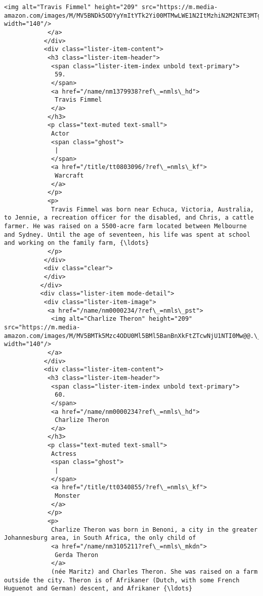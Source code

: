 \documentclass[11pt]{article}
\begin{document}
\begin{Verbatim}[commandchars=\\\{\}]
             <img alt="Travis Fimmel" height="209" src="https://m.media-amazon.com/images/M/MV5BNDk5ODYyYmItYTk2Yi00MTMwLWE1N2ItMzhiN2M2NTE3MTg1XkEyXkFqcGdeQXVyODc2OTcwNDE@.\_V1\_UY209\_CR79,0,140,209\_AL\_.jpg" width="140"/>
            </a>
           </div>
           <div class="lister-item-content">
            <h3 class="lister-item-header">
             <span class="lister-item-index unbold text-primary">
              59.
             </span>
             <a href="/name/nm1379938?ref\_=nmls\_hd">
              Travis Fimmel
             </a>
            </h3>
            <p class="text-muted text-small">
             Actor
             <span class="ghost">
              |
             </span>
             <a href="/title/tt0803096/?ref\_=nmls\_kf">
              Warcraft
             </a>
            </p>
            <p>
             Travis Fimmel was born near Echuca, Victoria, Australia, to Jennie, a recreation officer for the disabled, and Chris, a cattle farmer. He was raised on a 5500-acre farm located between Melbourne and Sydney. Until the age of seventeen, his life was spent at school and working on the family farm, {\ldots}
            </p>
           </div>
           <div class="clear">
           </div>
          </div>
          <div class="lister-item mode-detail">
           <div class="lister-item-image">
            <a href="/name/nm0000234/?ref\_=nmls\_pst">
             <img alt="Charlize Theron" height="209" src="https://m.media-amazon.com/images/M/MV5BMTk5Mzc4ODU0Ml5BMl5BanBnXkFtZTcwNjU1NTI0Mw@@.\_V1\_UY209\_CR8,0,140,209\_AL\_.jpg" width="140"/>
            </a>
           </div>
           <div class="lister-item-content">
            <h3 class="lister-item-header">
             <span class="lister-item-index unbold text-primary">
              60.
             </span>
             <a href="/name/nm0000234?ref\_=nmls\_hd">
              Charlize Theron
             </a>
            </h3>
            <p class="text-muted text-small">
             Actress
             <span class="ghost">
              |
             </span>
             <a href="/title/tt0340855/?ref\_=nmls\_kf">
              Monster
             </a>
            </p>
            <p>
             Charlize Theron was born in Benoni, a city in the greater Johannesburg area, in South Africa, the only child of
             <a href="/name/nm3105211?ref\_=nmls\_mkdn">
              Gerda Theron
             </a>
             (née Maritz) and Charles Theron. She was raised on a farm outside the city. Theron is of Afrikaner (Dutch, with some French Huguenot and German) descent, and Afrikaner {\ldots}

\end{Verbatim}
\end{document}
